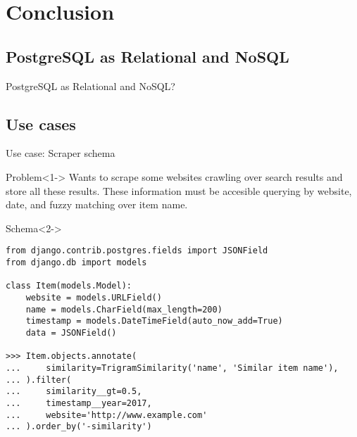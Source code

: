 \section{Conclusion}
\subsection{PostgreSQL as Relational and NoSQL}
\begin{frame}[standout]
    \huge{PostgreSQL as Relational and NoSQL?}

    \huge{\faDatabase}
\end{frame}

\subsection{Use cases}
\begin{frame}[fragile]{Use case: Scraper schema}
    \begin{block}{Problem}<1->
        Wants to scrape some websites crawling over search results and store all these results. These information must be accesible querying by website, date, and fuzzy matching over item name.
    \end{block}

    \begin{block}{Schema}<2->
        \begin{verbatim}
from django.contrib.postgres.fields import JSONField
from django.db import models

class Item(models.Model):
    website = models.URLField()
    name = models.CharField(max_length=200)
    timestamp = models.DateTimeField(auto_now_add=True)
    data = JSONField()

>>> Item.objects.annotate(
...     similarity=TrigramSimilarity('name', 'Similar item name'),
... ).filter(
...     similarity__gt=0.5,
...     timestamp__year=2017,
...     website='http://www.example.com'
... ).order_by('-similarity')
        \end{verbatim}
    \end{block}
\end{frame}
